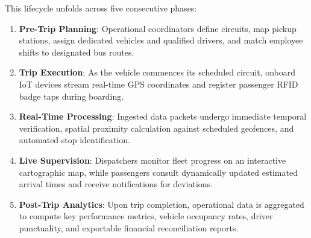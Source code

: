 This lifecycle unfolds across five consecutive phases:
\begin{enumerate}
  \item \textbf{Pre-Trip Planning}: Operational coordinators define circuits, map pickup stations, assign dedicated vehicles and qualified drivers, and match employee shifts to designated bus routes.
  \item \textbf{Trip Execution}: As the vehicle commences its scheduled circuit, onboard IoT devices stream real-time GPS coordinates and register passenger RFID badge taps during boarding.
  \item \textbf{Real-Time Processing}: Ingested data packets undergo immediate temporal verification, spatial proximity calculation against scheduled geofences, and automated stop identification.
  \item \textbf{Live Supervision}: Dispatchers monitor fleet progress on an interactive cartographic map, while passengers consult dynamically updated estimated arrival times and receive notifications for deviations.
  \item \textbf{Post-Trip Analytics}: Upon trip completion, operational data is aggregated to compute key performance metrics, vehicle occupancy rates, driver punctuality, and exportable financial reconciliation reports.
\end{enumerate}

